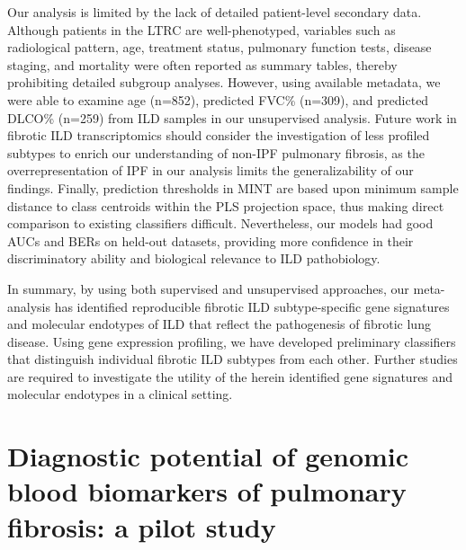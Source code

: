 \documentclass[
]{article}
\begin{document}
Our analysis is limited by the lack of detailed patient-level secondary data. Although patients in the LTRC are well-phenotyped, variables such as radiological pattern, age, treatment status, pulmonary function tests, disease staging, and mortality were often reported as summary tables, thereby prohibiting detailed subgroup analyses. However, using available metadata, we were able to examine age (n=852), predicted FVC\% (n=309), and predicted DLCO\% (n=259) from ILD samples in our unsupervised analysis. Future work in fibrotic ILD transcriptomics should consider the investigation of less profiled subtypes to enrich our understanding of non-IPF pulmonary fibrosis, as the overrepresentation of IPF in our analysis limits the generalizability of our findings. Finally, prediction thresholds in MINT are based upon minimum sample distance to class centroids within the PLS projection space, thus making direct comparison to existing classifiers difficult. Nevertheless, our models had good AUCs and BERs on held-out datasets, providing more confidence in their discriminatory ability and biological relevance to ILD pathobiology.

In summary, by using both supervised and unsupervised approaches, our meta-analysis has identified reproducible fibrotic ILD subtype-specific gene signatures and molecular endotypes of ILD that reflect the pathogenesis of fibrotic lung disease. Using gene expression profiling, we have developed preliminary classifiers that distinguish individual fibrotic ILD subtypes from each other. Further studies are required to investigate the utility of the herein identified gene signatures and molecular endotypes in a clinical setting.

\clearpage

\hypertarget{diagnostic-potential-of-genomic-blood-biomarkers-of-pulmonary-fibrosis-a-pilot-study}{%
\section{Diagnostic potential of genomic blood biomarkers of pulmonary fibrosis: a pilot study}\label{diagnostic-potential-of-genomic-blood-biomarkers-of-pulmonary-fibrosis-a-pilot-study}}

\renewcommand{\thefigure}{3.\arabic{figure}}
\setcounter{figure}{0}
\renewcommand{\thetable}{3.\arabic{table}}
\setcounter{table}{0}
\renewcommand{\theequation}{3.\arabic{equation}}
\setcounter{equation}{0}
\end{document}
